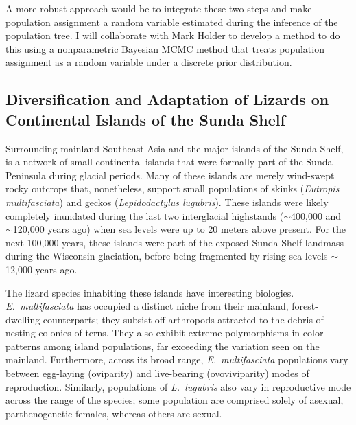 A more robust approach would be to integrate these two steps and make
population assignment a random variable estimated during the inference of the
population tree.
I will collaborate with Mark Holder to develop a method to do this using a
nonparametric Bayesian MCMC method that treats population assignment as a
random variable under a discrete prior distribution.

\subsection*{Diversification and Adaptation of Lizards on Continental Islands
of the Sunda Shelf}
Surrounding mainland Southeast Asia and the major islands of the Sunda Shelf,
is a network of small continental islands that were formally part of the Sunda
Peninsula during glacial periods.
Many of these islands are merely wind-swept rocky outcrops that, nonetheless,
support small populations of skinks (\emph{Eutropis multifasciata}) and geckos
(\emph{Lepidodactylus lugubris}).
These islands were likely completely inundated during the last two
interglacial highstands ($\sim$400,000 and $\sim$120,000 years ago) when sea
levels were up to 20 meters above present.
For the next 100,000 years, these islands were part of the exposed Sunda Shelf
landmass during the Wisconsin glaciation, before being fragmented by rising sea
levels $\sim$12,000 years ago.

The lizard species inhabiting these islands have interesting biologies.
\emph{E.\ multifasciata} has occupied a distinct niche from their mainland,
forest-dwelling counterparts; they subsist off arthropods attracted to the
debris of nesting colonies of terns.
They also exhibit extreme polymorphisms in color patterns among island
populations, far exceeding the variation seen on the mainland.
Furthermore, across its broad range, \emph{E.\ multifasciata} populations vary
between egg-laying (oviparity) and live-bearing (ovoviviparity) modes of
reproduction.
Similarly, populations of \emph{L.\ lugubris} also vary in reproductive mode
across the range of the species; some population are comprised solely of
asexual, parthenogenetic females, whereas others are sexual.

